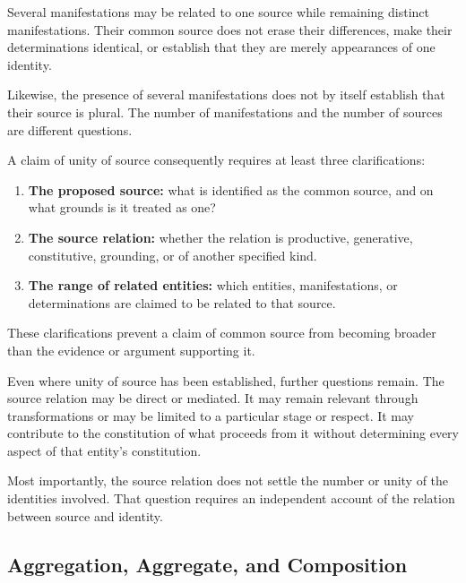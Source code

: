 Several manifestations may be related to one source
while remaining distinct manifestations. Their
common source does not erase their differences,
make their determinations identical, or establish
that they are merely appearances of one identity.

Likewise, the presence of several manifestations
does not by itself establish that their source
is plural. The number of manifestations and the
number of sources are different questions.

A claim of unity of source consequently requires
at least three clarifications:

\begin{enumerate}
    \item \textbf{The proposed source:} what is
    identified as the common source, and on what
    grounds is it treated as one?

    \item \textbf{The source relation:} whether
    the relation is productive, generative,
    constitutive, grounding, or of another
    specified kind.

    \item \textbf{The range of related entities:}
    which entities, manifestations, or
    determinations are claimed to be related
    to that source.
\end{enumerate}

These clarifications prevent a claim of common
source from becoming broader than the evidence
or argument supporting it.

Even where unity of source has been established,
further questions remain. The source relation
may be direct or mediated. It may remain relevant
through transformations or may be limited to
a particular stage or respect. It may contribute
to the constitution of what proceeds from it
without determining every aspect of that
entity's constitution.

Most importantly, the source relation does not
settle the number or unity of the identities
involved. That question requires an independent
account of the relation between source and identity.


\subsection{Aggregation, Aggregate, and Composition}

